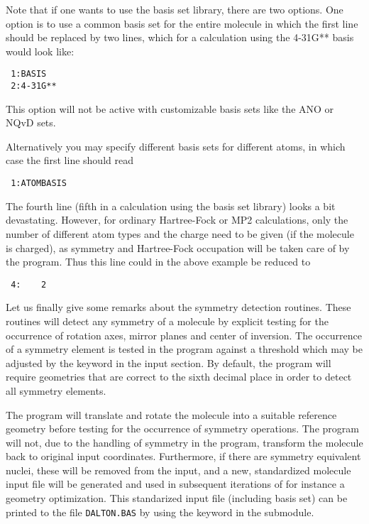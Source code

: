 Note that if one wants to use the basis set library, there are two 
options. One option is to use a common basis set for the entire
molecule in which the first line should be replaced by two lines,
which for a calculation using the 4-31G** basis would look like:
\begin{verbatim}
 1:BASIS
 2:4-31G**
\end{verbatim}
This option will not be active with customizable basis sets like the
ANO or NQvD sets.

Alternatively you may specify different basis sets for different
atoms, in which case the first line should read
\begin{verbatim}
 1:ATOMBASIS
\end{verbatim}

The fourth line (fifth in a calculation using the basis set library)
looks a bit devastating. However, for ordinary
Hartree-Fock or MP2
calculations, only the number of different atom types and the charge
need to be given (if the molecule is charged), as symmetry and
Hartree-Fock occupation will be taken 
care of by the program. Thus 
this line could in the above example be reduced to
\begin{verbatim}
 4:    2
\end{verbatim}

Let us finally give some remarks about the symmetry
detection
routines. These routines will detect any symmetry of a molecule
by explicit testing for the occurrence of rotation axes, mirror planes
and center of inversion. The occurrence of a symmetry element is
tested in the program against a threshold which may be adjusted by the
keyword  in the  input section. By default,
the program will require 
geometries that are correct to the sixth decimal place in order to
detect all symmetry elements.

The program will translate and rotate the molecule into a suitable
reference geometry before testing for the occurrence of symmetry
operations. The program will not, due to the handling of symmetry in the
program, transform  the molecule back to original input
coordinates. Furthermore, if there are 
symmetry equivalent nuclei, these will be removed from the input, and a
new, standardized molecule input file will be generated and used in
subsequent iterations of for instance a geometry optimization. This
standarized input file (including basis set) can be printed to the
file \verb|DALTON.BAS| by using the keyword  in the
 submodule.

